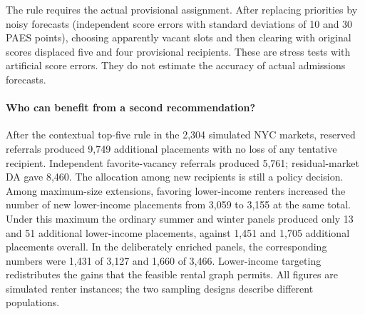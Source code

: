 The rule requires the actual provisional assignment. After replacing priorities by noisy forecasts (independent score errors with standard deviations of 10 and 30 PAES points), choosing apparently vacant slots and then clearing with original scores displaced five and four provisional recipients. These are stress tests with artificial score errors. They do not estimate the accuracy of actual admissions forecasts.

\paragraph{Who can benefit from a second recommendation?}
After the contextual top-five rule in the 2,304 simulated NYC markets, reserved referrals produced 9,749 additional placements with no loss of any tentative recipient. Independent favorite-vacancy referrals produced 5,761; residual-market DA gave 8,460. The allocation among new recipients is still a policy decision. Among maximum-size extensions, favoring lower-income renters increased the number of new lower-income placements from 3,059 to 3,155 at the same total. Under this maximum the ordinary summer and winter panels produced only 13 and 51 additional lower-income placements, against 1,451 and 1,705 additional placements overall. In the deliberately enriched panels, the corresponding numbers were 1,431 of 3,127 and 1,660 of 3,466. Lower-income targeting redistributes the gains that the feasible rental graph permits. All figures are simulated renter instances; the two sampling designs describe different populations.
